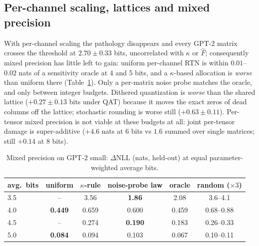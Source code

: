 \documentclass{article}
\begin{document}
\subsection{Per-channel scaling, lattices and mixed precision}
With per-channel scaling the pathology
disappears and every GPT-2 matrix crosses the threshold at $2.70\pm0.33$ bits, uncorrelated with $\kappa$ or $\hat F$;
consequently mixed precision has little left to gain: uniform per-channel RTN is within $0.01$--$0.02$ nats of a
sensitivity oracle at 4 and 5 bits, and a $\kappa$-based allocation is \emph{worse} than uniform there (Table~\ref{tab:mixed}). Only a per-matrix noise probe matches the oracle, and only between integer budgets.
Dithered quantization is \emph{worse} than the shared lattice ($+0.27\pm0.13$ bits under QAT) because it moves
the exact zeros of dead columns off the lattice; stochastic rounding is worse still ($+0.63\pm0.11$).
Per-tensor mixed precision is not viable at these budgets at all: joint per-tensor damage is super-additive
($+4.6$ nats at 6 bits vs $1.6$ summed over single matrices; still $+0.14$ at 8 bits).

\begin{table}[h]\centering\small
\caption{Mixed precision on GPT-2 small: $\Delta$NLL (nats, held-out) at equal parameter-weighted average bits.}
\label{tab:mixed}
\begin{tabular}{lccccc}\toprule
avg.\ bits & uniform & $\kappa$-rule & noise-probe law & oracle & random ($\times3$)\\\midrule
3.5 & -- & 3.56 & \textbf{1.86} & 2.08 & 3.6--4.1\\
4.0 & \textbf{0.449} & 0.659 & 0.600 & 0.459 & 0.68--0.88\\
4.5 & -- & 0.274 & \textbf{0.190} & 0.183 & 0.26--0.33\\
5.0 & \textbf{0.084} & 0.094 & 0.103 & 0.067 & 0.10--0.11\\\bottomrule
\end{tabular}
\end{table}
\end{document}
